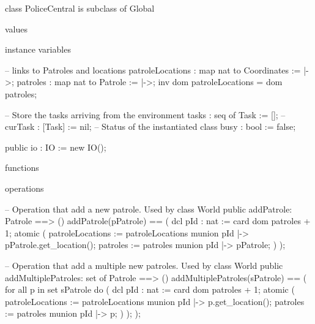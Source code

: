 \documentclass[a4paper]{article}
\begin{document}
\title{}
\author{}
\begin{vdm_al}
class PoliceCentral is subclass of Global

values

instance variables
    
    -- links to Patroles and locations
    patroleLocations : map nat to Coordinates := {|->};
    patroles         : map nat to Patrole := {|->};
    inv dom patroleLocations = dom patroles;
    
    -- Store the tasks arriving from the environment
    tasks : seq of Task := [];
    --curTask : [Task] := nil; 
    -- Status of the instantiated class
    busy : bool := false;

    public io : IO := new IO();

functions

operations
    
    -- Operation that add a new patrole. Used by class World
    public addPatrole: Patrole ==> ()
    addPatrole(pPatrole) ==
        (   
            dcl pId : nat := card dom patroles + 1;
            atomic
            (
                patroleLocations := patroleLocations munion {pId |-> pPatrole.get_location()};
                patroles := patroles munion {pId |-> pPatrole};  
            )
        );
        
    -- Operation that add a multiple new patroles. Used by class World
    public addMultiplePatroles: set of Patrole ==> ()
    addMultiplePatroles(sPatrole) ==
        (   
            for all p in set sPatrole do
            (    
                dcl pId : nat := card dom patroles + 1;
                atomic
                (
                    patroleLocations := patroleLocations munion {pId |-> p.get_location()};
                    patroles := patroles munion {pId |-> p};   
                )
            );
        );


\end{vdm_al}
\end{document}
